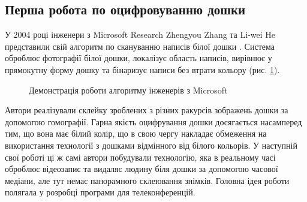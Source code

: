 \subsection{Перша робота по оцифровуванню дошки}
У 2004 році інженери з Microsoft Research Zhengyou Zhang
та Li-wei He представили свій алгоритм по скануванню написів
білої дошки \cite{zhang:2004}. Система оброблює фотографії білої дошки, локалізує область
написів, вирівнює у прямокутну форму дошку та бінаризує написи без втрати
кольору (рис. \ref{fig:zhang:2004}).

\begin{figure}[H]
  \centering
  \caption{Демонстрація роботи алгоритму інженерів з Microsoft \cite{zhang:2004}
    \label{fig:zhang:2004}
  }
\end{figure}
Автори реалізували склейку зроблених з різних
ракурсів зображень дошки за допомогою гомографії.
Гарна якість оцифрування дошки
досягається насамперед тим, що вона має білий колір, що в свою чергу
накладає обмеження на використання технології з дошками відмінного
від білого кольорів.
У наступній свої роботі \cite{zhang:2007} ці ж самі автори побудували
технологію, яка в реальному часі оброблює відеозапис та видаляє людину біля
дошки за допомогою часової медіани, але тут немає
панорамного склеювання знімків. Головна ідея роботи полягала у розробці
програми для телеконференцій.

